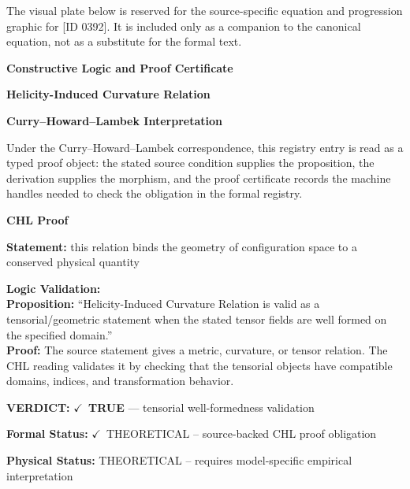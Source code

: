 \begingroup\footnotesize\sloppy
The visual plate below is reserved for the source-specific equation and progression graphic for [ID 0392]. It is included only as a companion to the canonical equation, not as a substitute for the formal text.
\par\endgroup
\ifTZPDarkEdition
{}
\fi

\clearpage
\begingroup\tzpsupportsetup
\noindent\textbf{\fontsize{10.8pt}{12.8pt}\selectfont [ID 0392] Constructive Logic and Proof Certificate}\par
\noindent\textbf{\fontsize{10pt}{12pt}\selectfont Helicity-Induced Curvature Relation}\par
\vspace{0.45em}
\begingroup
\footnotesize
\setlength{\parskip}{0.22em}
\setlength{\parindent}{0pt}
\noindent\textbf{Curry--Howard--Lambek Interpretation}\par
Under the Curry--Howard--Lambek correspondence, this registry entry is read as a typed proof
object: the stated source condition supplies the proposition, the derivation supplies the
morphism, and the proof certificate records the machine handles needed to check the obligation
in the formal registry.

\vspace{0.45em}
\noindent\textbf{CHL Proof}\par
\textbf{Statement:} this relation binds the geometry of configuration space to a conserved physical quantity

\textbf{Logic Validation:}\\
\textbf{Proposition:} ``Helicity-Induced Curvature Relation is valid as a tensorial/geometric statement when the
stated tensor fields are well formed on the specified domain.''\\
\textbf{Proof:} The source statement gives a metric, curvature, or tensor relation. The CHL reading
validates it by checking that the tensorial objects have compatible domains, indices,
and transformation behavior.

\textbf{VERDICT:} \ensuremath{\checkmark}\ \textbf{TRUE} --- tensorial well-formedness validation

\textbf{Formal Status:} \ensuremath{\checkmark}\ THEORETICAL -- source-backed CHL proof obligation

\textbf{Physical Status:} THEORETICAL -- requires model-specific empirical interpretation
\par\vspace{0.45em}
\par
\ifTZPDarkEdition
{}
\fi
\endgroup
\endgroup
